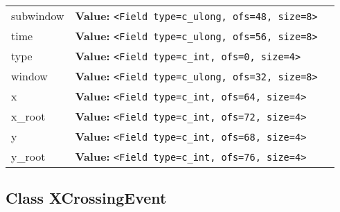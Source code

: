 \begin{longtable}{|p{\varnamewidth}|p{\vardescrwidth}|l}
\cline{1-2}
\raggedright s\-u\-b\-w\-i\-n\-d\-o\-w\- & \raggedright \textbf{Value:} 
{\tt {\textless}Field type=c\_ulong, ofs=48, size=8{\textgreater}}&\\
\cline{1-2}
\raggedright t\-i\-m\-e\- & \raggedright \textbf{Value:} 
{\tt {\textless}Field type=c\_ulong, ofs=56, size=8{\textgreater}}&\\
\cline{1-2}
\raggedright t\-y\-p\-e\- & \raggedright \textbf{Value:} 
{\tt {\textless}Field type=c\_int, ofs=0, size=4{\textgreater}}&\\
\cline{1-2}
\raggedright w\-i\-n\-d\-o\-w\- & \raggedright \textbf{Value:} 
{\tt {\textless}Field type=c\_ulong, ofs=32, size=8{\textgreater}}&\\
\cline{1-2}
\raggedright x\- & \raggedright \textbf{Value:} 
{\tt {\textless}Field type=c\_int, ofs=64, size=4{\textgreater}}&\\
\cline{1-2}
\raggedright x\-\_\-r\-o\-o\-t\- & \raggedright \textbf{Value:} 
{\tt {\textless}Field type=c\_int, ofs=72, size=4{\textgreater}}&\\
\cline{1-2}
\raggedright y\- & \raggedright \textbf{Value:} 
{\tt {\textless}Field type=c\_int, ofs=68, size=4{\textgreater}}&\\
\cline{1-2}
\raggedright y\-\_\-r\-o\-o\-t\- & \raggedright \textbf{Value:} 
{\tt {\textless}Field type=c\_int, ofs=76, size=4{\textgreater}}&\\
\cline{1-2}
\end{longtable}



\subsection{Class XCrossingEvent}

